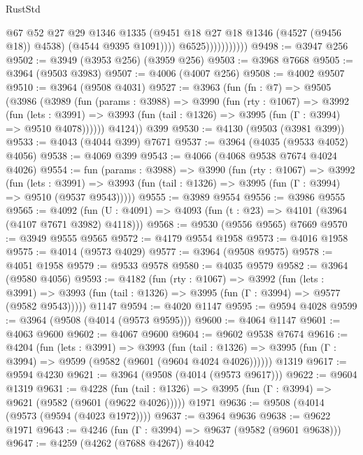 \begin{lexlean}{RustStd}
\begin{coremodule}
{\begin{coremodule}
{{{{{{{{{{{{{{{{{{{{{{{{{{{{{{{{{{{{{{                                @67
                                @52
                                @27
                                @29
                                @1346
                                @1335
                                (@9451 @18 @27 @18 @1346 (@4527 (@9456 @18)) @4538)
                                (@4544 @9395 @1091))))
                          @6525)))))))))))
@9498 := @3947 @256
@9502 := @3949 (@3953 @256) (@3959 @256)
@9503 := @3968 @7668
@9505 := @3964 (@9503 @3983)
@9507 := @4006 (@4007 @256)
@9508 := @4002 @9507
@9510 := @3964 (@9508 @4031)
@9527 := @3963
    (fun (fn : @7) =>
    @9505
      (@3986
        (@3989
          (fun (params : @3988) =>
          @3990
            (fun (rty : @1067) =>
            @3992
              (fun (lets : @3991) =>
              @3993 (fun (tail : @1326) => @3995 (fun (Γ : @3994) => @9510 @4078))))))
        @4124))
    @399
@9530 := @4130 (@9503 (@3981 @399))
@9533 := @4043 (@4044 @399) @7671
@9537 := @3964 (@4035 (@9533 @4052) @4056)
@9538 := @4069 @399
@9543 := @4066 (@4068 @9538 @7674 @4024 @4026)
@9554 := fun (params : @3988) =>
  @3990
    (fun (rty : @1067) =>
    @3992
      (fun (lets : @3991) =>
      @3993 (fun (tail : @1326) => @3995 (fun (Γ : @3994) => @9510 (@9537 @9543)))))
@9555 := @3989 @9554
@9556 := @3986 @9555
@9565 := @4092 (fun (U : @4091) => @4093 (fun (t : @23) => @4101 (@3964 (@4107 @7671 @3982) @4118)))
@9568 := @9530 (@9556 @9565) @7669
@9570 := @3949 @9555 @9565
@9572 := @4179 @9554 @1958
@9573 := @4016 @1958
@9575 := @4014 (@9573 @4029)
@9577 := @3964 (@9508 @9575)
@9578 := @4051 @1958
@9579 := @9533 @9578
@9580 := @4035 @9579
@9582 := @3964 (@9580 @4056)
@9593 := @4182
    (fun (rty : @1067) =>
    @3992
      (fun (lets : @3991) =>
      @3993 (fun (tail : @1326) => @3995 (fun (Γ : @3994) => @9577 (@9582 @9543)))))
    @1147
@9594 := @4020 @1147
@9595 := @9594 @4028
@9599 := @3964 (@9508 (@4014 (@9573 @9595)))
@9600 := @4064 @1147
@9601 := @4063 @9600
@9602 := @4067 @9600
@9604 := @9602 @9538 @7674
@9616 := @4204
    (fun (lets : @3991) =>
    @3993
      (fun (tail : @1326) => @3995 (fun (Γ : @3994) => @9599 (@9582 (@9601 (@9604 @4024 @4026))))))
    @1319
@9617 := @9594 @4230
@9621 := @3964 (@9508 (@4014 (@9573 @9617)))
@9622 := @9604 @1319
@9631 := @4228
    (fun (tail : @1326) => @3995 (fun (Γ : @3994) => @9621 (@9582 (@9601 (@9622 @4026)))))
    @1971
@9636 := @9508 (@4014 (@9573 (@9594 (@4023 @1972))))
@9637 := @3964 @9636
@9638 := @9622 @1971
@9643 := @4246 (fun (Γ : @3994) => @9637 (@9582 (@9601 @9638)))
@9647 := @4259 (@4262 (@7688 @4267)) @4042
}}}}}}}}}}}}}}}}}}}}}}}}}}}}}}}}}}}}}}
\end{coremodule}}
\end{coremodule}
\end{lexlean}
